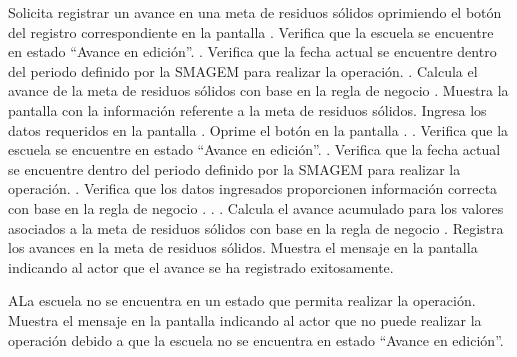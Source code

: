  \begin{UCtrayectoria}
    \UCpaso[\UCactor] Solicita registrar un avance en una meta de residuos sólidos oprimiendo el botón \botMetas del registro correspondiente en la pantalla .
    \UCpaso[\UCsist] Verifica que la escuela se encuentre en estado ``Avance en edición''. .
    \UCpaso[\UCsist] Verifica que la fecha actual se encuentre dentro del periodo definido por la SMAGEM para realizar la operación. .
    \UCpaso[\UCsist] Calcula el avance de la meta de residuos sólidos con base en la regla de negocio .    
    \UCpaso[\UCsist] Muestra la pantalla  con la información referente a la meta de residuos sólidos. 
    \UCpaso[\UCactor] Ingresa los datos requeridos en la pantalla . \label{cus28:RegAvanceAgua}
    \UCpaso[\UCactor] Oprime el botón  en la pantalla . .
    \UCpaso[\UCsist] Verifica que la escuela se encuentre en estado ``Avance en edición''. .
    \UCpaso[\UCsist] Verifica que la fecha actual se encuentre dentro del periodo definido por la SMAGEM para realizar la operación. .
    \UCpaso[\UCsist] Verifica que los datos ingresados proporcionen información correcta con base en la regla de negocio .  . .
    \UCpaso[\UCsist] Calcula el avance acumulado para los valores asociados a la meta de residuos sólidos con base en la regla de negocio .
    \UCpaso[\UCsist] Registra los avances en la meta de residuos sólidos.
    \UCpaso[\UCsist] Muestra el mensaje  en la pantalla  indicando al actor que el avance se ha registrado exitosamente.
 \end{UCtrayectoria}
 
     \begin{UCtrayectoriaA}{A}{La escuela no se encuentra en un estado que permita realizar la operación.}
	\UCpaso[\UCsist] Muestra el mensaje  en la pantalla  indicando al actor que no puede realizar la operación debido a que la escuela no se encuentra en estado ``Avance en edición''. 
    \end{UCtrayectoriaA}
 
